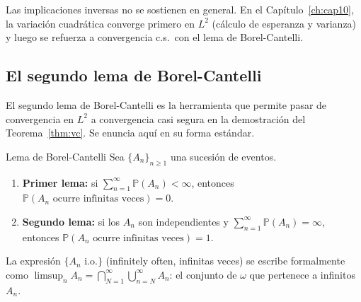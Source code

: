 \begin{center}
\end{center}

Las implicaciones inversas no se sostienen en general. En el
Capítulo~\ref{ch:cap10}, la variación cuadrática converge primero en $L^2$
(cálculo de esperanza y varianza) y luego se refuerza a convergencia c.s.\ con
el lema de Borel-Cantelli.

\subsection{El segundo lema de Borel-Cantelli}
\label{subsec:ap_borel_cantelli}

El segundo lema de Borel-Cantelli es la herramienta que permite pasar de
convergencia en $L^2$ a convergencia casi segura en la demostración del
Teorema~\ref{thm:vc}. Se enuncia aquí en su forma estándar.

\begin{teorema}{Lema de Borel-Cantelli}
\label{thm:ap_bc}
Sea $\{A_n\}_{n\geq 1}$ una sucesión de eventos.
\begin{enumerate}
  \item \textbf{Primer lema:} si $\sum_{n=1}^\infty \mathbb{P}(A_n) < \infty$,
        entonces $\mathbb{P}(A_n\text{ ocurre infinitas veces}) = 0$.
  \item \textbf{Segundo lema:} si los $A_n$ son independientes y
        $\sum_{n=1}^\infty \mathbb{P}(A_n) = \infty$, entonces
        $\mathbb{P}(A_n\text{ ocurre infinitas veces}) = 1$.
\end{enumerate}
\end{teorema}

La expresión $\{A_n \text{ i.o.}\}$ (infinitely often, infinitas veces) se
escribe formalmente como $\limsup_n A_n = \bigcap_{N=1}^\infty\bigcup_{n=N}^\infty
A_n$: el conjunto de $\omega$ que pertenece a infinitos $A_n$.

